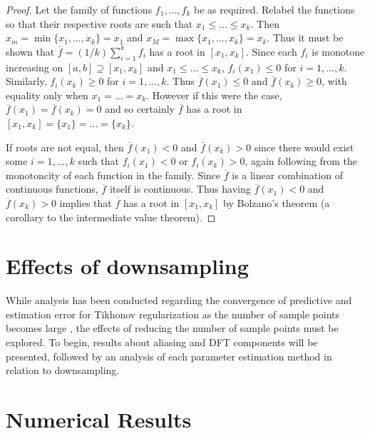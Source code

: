 \documentclass[12pt]{article}
\begin{document}
\begin{proof}
Let the family of functions $f_1,\ldots,f_k$ be as required. Relabel the functions so that their respective roots are such that $x_1 \leq \ldots \leq x_k$. Then $x_m = \min\{x_1,\ldots,x_k\} = x_1$ and $x_M = \max\{x_1,\ldots,x_k\} = x_k$. Thus it must be shown that $\overline{f} = (1/k)\sum_{i=1}^k f_i$ has a root in $[x_1,x_k]$. Since each $f_i$ is monotone increasing on $[a,b] \supseteq [x_1,x_k]$ and $x_1 \leq \ldots \leq x_k$, $f_i(x_1) \leq 0$ for $i = 1,\ldots,k$. Similarly, $f_i(x_k) \geq 0$ for $i = 1,\ldots,k$. Thus $\overline{f}(x_1) \leq 0$ and $\overline{f}(x_k) \geq 0$, with equality only when $x_1 = \ldots = x_k$. However if this were the case, $\overline{f}(x_1) = \overline{f}(x_k) = 0$ and so certainly $\overline{f}$ has a root in $[x_1,x_k] = \{x_1\} = \ldots = \{x_k\}$. \par 
If roots are not equal, then $\overline{f}(x_1) < 0$ and $\overline{f}(x_k) > 0$ since there would exist some $i = 1,\ldots,k$ such that $f_i(x_1) < 0$ or $f_i(x_k) > 0$, again following from the monotoncity of each function in the family. Since $\overline{f}$ is a linear combination of continuous functions, $\overline{f}$ itself is continuous. Thus having $\overline{f}(x_1) < 0$ and $\overline{f}(x_k) > 0$ implies that $\overline{f}$ has a root in $[x_1,x_k]$ by Bolzano's theorem (a corollary to the intermediate value theorem).
\end{proof}

\section{Effects of downsampling} \label{sec:Effects of downsampling}
While analysis has been conducted regarding the convergence of predictive and estimation error for Tikhonov regularization as the number of sample points becomes large \cite{Vogel:2002}, the effects of reducing the number of sample points must be explored. To begin, results about aliasing and DFT components will be presented, followed by an analysis of each parameter estimation method in relation to downsampling. 

\section{Numerical Results} \label{Numerical results}
\end{document}
